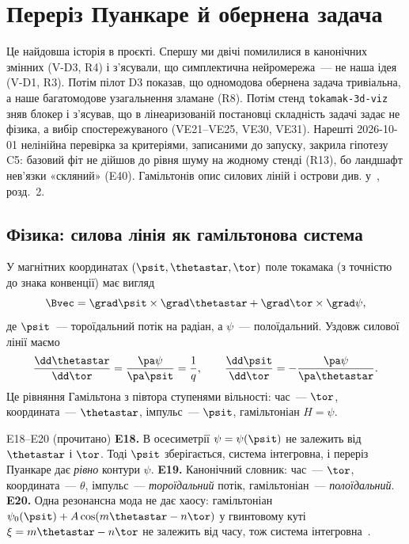 \chapter{Переріз Пуанкаре й обернена задача}\label{ch:g07}

Це найдовша історія в проєкті. Спершу ми двічі помилилися в канонічних змінних (V-D3, R4) і з'ясували, що симплектична нейромережа~--- не наша ідея (V-D1, R3). Потім пілот D3 показав, що одномодова обернена задача тривіальна, а наше багатомодове узагальнення зламане (R8). Потім стенд \texttt{tokamak-3d-viz} зняв блокер і з'ясував, що в лінеаризованій постановці складність задачі задає не фізика, а вибір спостережуваного (VE21--VE25, VE30, VE31). Нарешті 2026-10-01 нелінійна перевірка за критеріями, записаними до запуску, закрила гіпотезу C5: базовий фіт не дійшов до рівня шуму на жодному стенді (R13), бо ландшафт нев'язки «скляний» (E40). Гамільтонів опис силових ліній і острови див. у~\cite{Manual}, розд.~2.

\section{Фізика: силова лінія як гамільтонова система}\label{sec:g07-ham}

У магнітних координатах $(\psit,\thetastar,\tor)$ поле токамака (з точністю до знака конвенції) має вигляд
\begin{equation}\label{eq:g07-B}
  \Bvec=\grad\psit\times\grad\thetastar+\grad\tor\times\grad\psi ,
\end{equation}
де $\psit$~--- тороїдальний потік на радіан, а $\psi$~--- полоїдальний. Уздовж силової лінії маємо
\begin{equation}\label{eq:g07-hamilton}
  \frac{\dd\thetastar}{\dd\tor}=\frac{\pa\psi}{\pa\psit}=\frac1q,\qquad
  \frac{\dd\psit}{\dd\tor}=-\frac{\pa\psi}{\pa\thetastar}.
\end{equation}
Це рівняння Гамільтона з півтора ступенями вільності: час~--- $\tor$, координата~--- $\thetastar$, імпульс~--- $\psit$, гамільтоніан $H=\psi$.

\begin{established}{E18--E20 (прочитано)}
\textbf{E18.} В осесиметрії $\psi=\psi(\psit)$ не залежить від $\thetastar$ і $\tor$. Тоді $\psit$ зберігається, система інтегровна, і переріз Пуанкаре дає \emph{рівно} контури $\psi$.
\textbf{E19.} Канонічний словник: час~--- $\tor$, координата~--- $\theta$, імпульс~--- \emph{тороїдальний} потік, гамільтоніан~--- \emph{полоїдальний}.
\textbf{E20.} Одна резонансна мода не дає хаосу: гамільтоніан $\psi_0(\psit)+A\cos(m\thetastar-n\tor)$ у гвинтовому куті $\xi=m\thetastar-n\tor$ не залежить від часу, тож система інтегровна~\cite{RegEst,Escande2024}.
\end{established}

